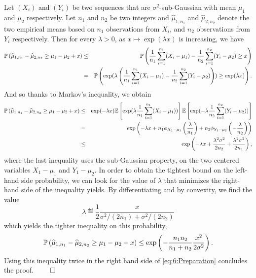 Let $(X_i)$ and $(Y_i)$ be two \iid{} sequences that are $\sigma^2$-sub-Gaussian with mean $\mu_1$ and $\mu_2$ respectively. Let $n_1$ and $n_2$ be two integers and $\widehat{\mu}_{1,n_1}$ and $\widehat{\mu}_{2,n_2}$ denote the two empirical means based on $n_1$ observations from $X_i$, and $n_2$ observations from $Y_i$ respectively.
Then for every $\lambda > 0$, as $x \mapsto \exp(\lambda x)$ is increasing, we have
\begin{eqnarray*}
    \mathbb{P}\left(\widehat{\mu}_{1,n_1} - \widehat{\mu}_{2,n_2} \geq \mu_1 - \mu_2 + x \right)
    & \leq & \mathbb{P}\left(\frac{1}{n_1}\sum_{i=1}^{n_1} (X_i-\mu_1) - \frac{1}{n_2}\sum_{i=1}^{n_2} (Y_i - \mu_2) \geq x \right)\\
    & = & \mathbb{P}\left(\exp(\lambda \left(\frac{1}{n_1}\sum\limits_{i=1}^{n_1} (X_i-\mu_1) - \frac{1}{n_2}\sum\limits_{i=1}^{n_2} (Y_i - \mu_2)\right)) \geq \exp(\lambda x) \right).
\end{eqnarray*}
And so thanks to Markov's inequality, we obtain
\begin{eqnarray*}
    \mathbb{P}\left(\widehat{\mu}_{1,n_1} - \widehat{\mu}_{2,n_2} \geq \mu_1 - \mu_2 + x \right)
    & \leq & \exp(-\lambda x) \mathbb{E}\left[\exp(\lambda \frac{1}{n_1}\sum\limits_{i=1}^{n_1} (X_i-\mu_1))\right]\mathbb{E}\left[\exp(-\lambda \frac{1}{n_2}\sum\limits_{i=1}^{n_2} (Y_i-\mu_2))\right] \\
    & = & \exp\left(- \lambda x + n_1\phi_{X_1 - \mu_1}\left(\frac{\lambda}{n_1}\right) + n_2\phi_{Y_1 - \mu_2}\left(-\frac{\lambda}{n_2}\right)\right) \\
    & \leq & \exp\left(- \lambda x + \frac{\lambda^2\sigma^2}{2n_2} + \frac{\lambda^2\sigma^2}{2n_1}\right),
\end{eqnarray*}
%
where the last inequality uses the sub-Gaussian property,
on the two centered variables $X_1-\mu_1$ and $Y_1-\mu_2$.
%
In order to obtain the tightest bound on the left-hand side probability,
we can look for the value of $\lambda$ that minimizes the right-hand side of the inequality yields.
By differentiating and by convexity, we find the value
\[\lambda \eqdef \frac{1}{2} \frac{x}{\sigma^2/(2n_1) + \sigma^2/(2n_2)}\]
which yields the tighter inequality on this probability,
\[\mathbb{P}\left(\widehat{\mu}_{1,n_1} - \widehat{\mu}_{2,n_2} \geq \mu_1 - \mu_2 + x \right) \leq \exp\left(- \frac{n_1n_2}{n_1+n_2}\frac{x^2}{2\sigma^2}\right).\]
%
Using this inequality twice in the right hand side of \eqref{eq:6:Preparation} concludes the proof.
\hfill{} $\qed$  %

